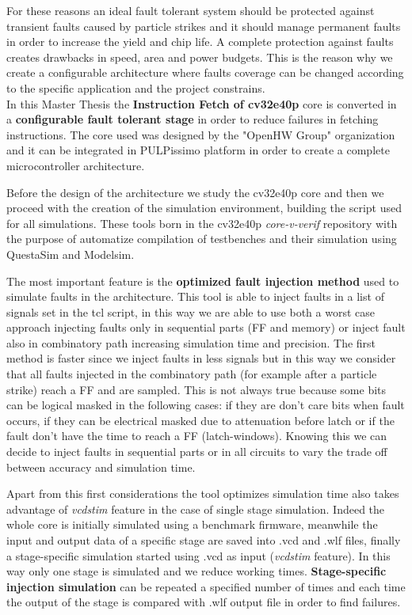 \documentclass[corpo=11pt,english,numerazioneromana]{toptesi}
\begin{document}
For these reasons an ideal fault tolerant system should be protected against transient faults caused by particle strikes and it should manage permanent faults in order to increase the yield and chip life. A complete protection against faults creates drawbacks in speed, area and power budgets. This is the reason why we create a configurable architecture where faults coverage can be changed according to the specific application and the project constrains.   \\

In this Master Thesis the \textbf{Instruction Fetch of cv32e40p} core is converted in a \textbf{configurable fault tolerant stage} in order to reduce failures in fetching instructions. The core used was designed by the "OpenHW Group" organization and it can be integrated in PULPissimo platform in order to create a complete microcontroller architecture. 

Before the design of the architecture we study the cv32e40p core and then we proceed with the creation of the simulation environment, building the script used for all simulations. These tools born in the cv32e40p \textit{core-v-verif} repository with the purpose of automatize compilation of testbenches and their simulation using QuestaSim and Modelsim. 

The most important feature  is the \textbf{optimized fault injection method} used to simulate faults in the architecture. 
This tool is able to inject faults in a list of signals set in the tcl script, in this way we are able to use both a worst case approach injecting faults only in sequential parts (FF and memory) or inject fault also in combinatory path increasing simulation time and precision. 
The first method is faster since we inject faults in less signals but in this way we consider that all faults injected in the combinatory path (for example after a particle strike) reach a FF and are sampled. This is not always true because some bits can be logical masked in the following cases: if they are don't care bits when fault occurs, if they can be electrical masked due to attenuation before latch or if the fault don't have the time to reach a FF (latch-windows). 
Knowing this we can decide to inject faults in sequential parts or in all circuits to vary the trade off between accuracy and simulation time.

Apart from this first considerations the tool optimizes simulation time also takes advantage of \textit{vcdstim} feature in the case of single stage simulation. Indeed the whole core is  initially simulated using a benchmark firmware, meanwhile the input and output data of a specific stage are saved into .vcd and .wlf files, finally a stage-specific simulation started using .vcd as input (\textit{vcdstim} feature). In this way only one stage is simulated and we reduce working times. \textbf{Stage-specific injection simulation} can be repeated a specified number of times and each time the output of the stage is compared with .wlf output file in order to find failures.   
\end{document}
